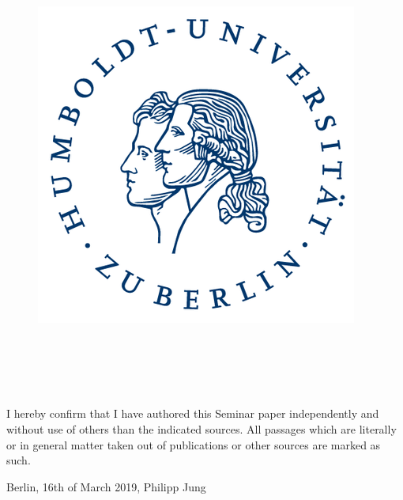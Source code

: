 \begin{titlepage}


\begin{figure}[h]
    \begin{flushright}
    \includegraphics[width=.3\textwidth]{images/hu-logo.png}  
    \end{flushright}
  \label{fig:spektren01sd}
\end{figure}

\vspace{10mm}


\begin{center}
		\vspace{10mm}
	
	{\Huge
					\versuch \\
			}
		\vspace{10mm}
		{\untertitel}\\
		\vspace{10mm}
		\datumversuch \\
		\vspace{15mm}
		
\end{center}

\begin{table}[h]
\begin{tabular}{l l}

\end{tabular}
\end{table}  
\begin{center}
I hereby confirm that I have authored this Seminar paper independently and without use of others than the indicated sources. All passages which are literally or in general matter taken out of publications or other sources are marked as such.
\vspace{5mm}

Berlin, 16th of March 2019, Philipp Jung
\end{center}
\vspace{0mm}

\end{titlepage}
